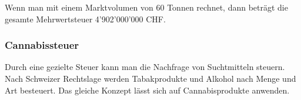 \documentclass[../main.tex]{subfiles}
\begin{document}
	 \noindent
	 Wenn man mit einem Marktvolumen von 60 Tonnen rechnet, dann beträgt die gesamte Mehrwertsteuer 4’902’000’000 CHF.
	 
	 \subsubsection{Cannabissteuer}
	 Durch eine gezielte Steuer kann man die Nachfrage von Suchtmitteln steuern. Nach Schweizer Rechtslage werden Tabakprodukte und Alkohol nach Menge und Art besteuert. 
	 Das gleiche Konzept lässt sich auf Cannabisprodukte anwenden. 
	 
\end{document}
